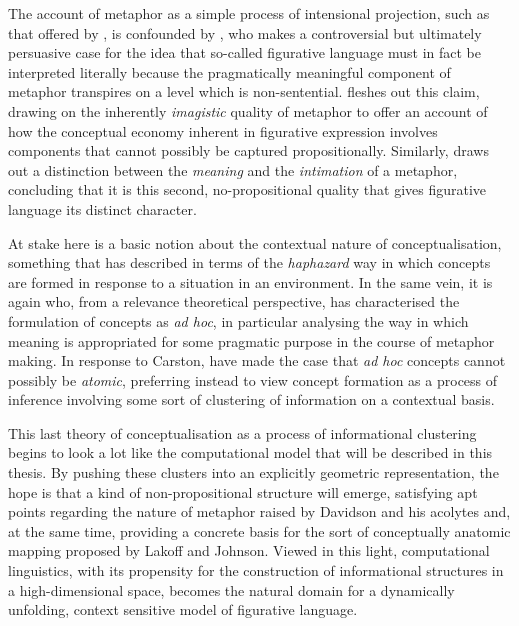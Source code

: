 The account of metaphor as a simple process of intensional projection, such as that offered by \cite{Searle}, is confounded by \cite{Davidson}, who makes a controversial but ultimately persuasive case for the idea that so-called figurative language must in fact be interpreted literally because the pragmatically meaningful component of metaphor transpires on a level which is non-sentential.  \cite{Carston} fleshes out this claim, drawing on the inherently \emph{imagistic} quality of metaphor to offer an account of how the conceptual economy inherent in figurative expression involves components that cannot possibly be captured propositionally.  Similarly, \cite{Reimer} draws out a distinction between the \emph{meaning} and the \emph{intimation} of a metaphor, concluding that it is this second, no-propositional quality that gives figurative language its distinct character.

At stake here is a basic notion about the contextual nature of conceptualisation, something that \cite{Barsalou} has described in terms of the \emph{haphazard} way in which concepts are formed in response to a situation in an environment.  In the same vein, it is again \cite{Carston} who, from a relevance theoretical perspective, has characterised the formulation of concepts as \emph{ad hoc}, in particular analysing the way in which meaning is appropriated for some pragmatic purpose in the course of metaphor making.  In response to Carston, \cite{Allott} have made the case that \emph{ad hoc} concepts cannot possibly be \emph{atomic}, preferring instead to view concept formation as a process of inference involving some sort of clustering of information on a contextual basis.

This last theory of conceptualisation as a process of informational clustering begins to look a lot like the computational model that will be described in this thesis.  By pushing these clusters into an explicitly geometric representation, the hope is that a kind of non-propositional structure will emerge, satisfying apt points regarding the nature of metaphor raised by Davidson and his acolytes and, at the same time, providing a concrete basis for the sort of conceptually anatomic mapping proposed by Lakoff and Johnson.  Viewed in this light, computational linguistics, with its propensity for the construction of informational structures in a high-dimensional space, becomes the natural domain for a dynamically unfolding, context sensitive model of figurative language.

